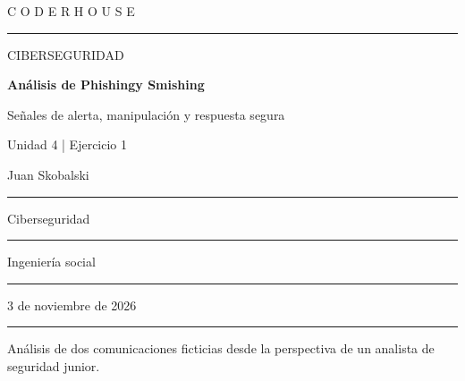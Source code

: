 \documentclass[11pt,a4paper]{article}
\begin{document}
\thispagestyle{empty}
\vspace*{1.0cm}
{\color{turquesa}\large C O D E R H O U S E}\par
\vspace{0.4cm}
{\color{linea}\rule{\textwidth}{1.2pt}}\par
\vspace{2.2cm}
{\color{gris}\Large CIBERSEGURIDAD}\par
\vspace{0.45cm}
{\color{azul}\Huge\bfseries Análisis de Phishing\newline y Smishing}\par
\vspace{0.45cm}
{\color{turquesa}\LARGE Señales de alerta, manipulación y respuesta segura}\par
\vspace{1.0cm}
{\color{gris}\large Unidad 4 | Ejercicio 1}\par

\vfill
\noindent\colorbox{fondo}{%
  \begin{minipage}{\dimexpr\textwidth-2\fboxsep}
    \vspace{0.28cm}
    \noindent{}Juan Skobalski\par
    \vspace{0.18cm}\color{linea}\hrule\color{black}\vspace{0.18cm}
    \noindent{}Ciberseguridad\par
    \vspace{0.18cm}\color{linea}\hrule\color{black}\vspace{0.18cm}
    \noindent{}Ingeniería social\par
    \vspace{0.18cm}\color{linea}\hrule\color{black}\vspace{0.18cm}
    \noindent{}3 de noviembre de 2026\par
    \vspace{0.28cm}
  \end{minipage}}
\vspace{0.75cm}
{\color{linea}\rule{\textwidth}{1.2pt}}\par
\vspace{0.25cm}
{\small\color{gris}Análisis de dos comunicaciones ficticias desde la perspectiva de un analista de seguridad junior.}
\end{document}
